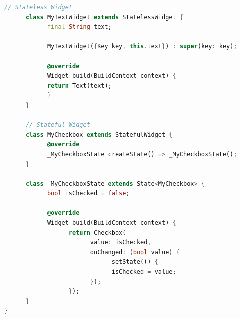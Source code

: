 \begin{lstlisting}[language=Dart, caption=Example of a stateful and stateless widget, label=lst:dartWidgets]
      // Stateless Widget
      class MyTextWidget extends StatelessWidget {
            final String text;

            MyTextWidget({Key key, this.text}) : super(key: key);

            @override
            Widget build(BuildContext context) {
            return Text(text);
            }
      }

      // Stateful Widget
      class MyCheckbox extends StatefulWidget {
            @override
            _MyCheckboxState createState() => _MyCheckboxState();
      }

      class _MyCheckboxState extends State<MyCheckbox> {
            bool isChecked = false;

            @override
            Widget build(BuildContext context) {
                  return Checkbox(
                        value: isChecked,
                        onChanged: (bool value) {
                              setState(() {
                              isChecked = value;
                        });
                  });
      }
}
\end{lstlisting}

